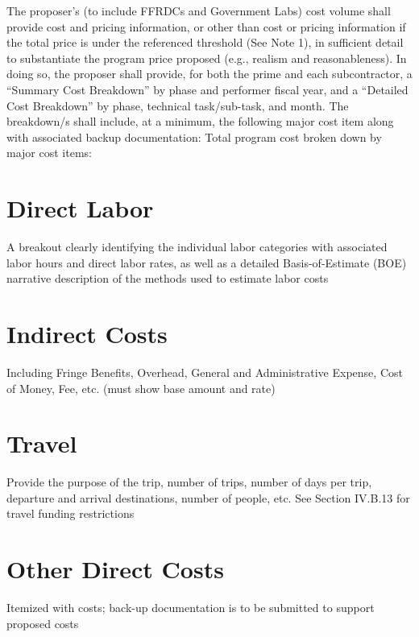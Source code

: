 The proposer’s (to include FFRDCs and Government Labs) cost volume shall provide cost and
pricing information, or other than cost or pricing information if the total price is under the
referenced threshold (See Note 1), in sufficient detail to substantiate the program price proposed
(e.g., realism and reasonableness). In doing so, the proposer shall provide, for both the prime
and each subcontractor, a “Summary Cost Breakdown” by phase and performer fiscal year,
and a “Detailed Cost Breakdown” by phase, technical task/sub-task, and month. The
breakdown/s shall include, at a minimum, the following major cost item along with associated
backup documentation:
Total program cost broken down by major cost items:

\section{Direct Labor}
A breakout clearly identifying the individual labor categories with associated labor hours and
direct labor rates, as well as a detailed Basis-of-Estimate (BOE) narrative description of the
methods used to estimate labor costs
\section{Indirect Costs}
Including Fringe Benefits, Overhead, General and Administrative Expense, Cost of Money,
Fee, etc. (must show base amount and rate)
\section{Travel}
Provide the purpose of the trip, number of trips, number of days per trip, departure and
arrival destinations, number of people, etc. See Section IV.B.13 for travel funding
restrictions
\section{Other Direct Costs}
Itemized with costs; back-up documentation is to be submitted to support proposed costs
